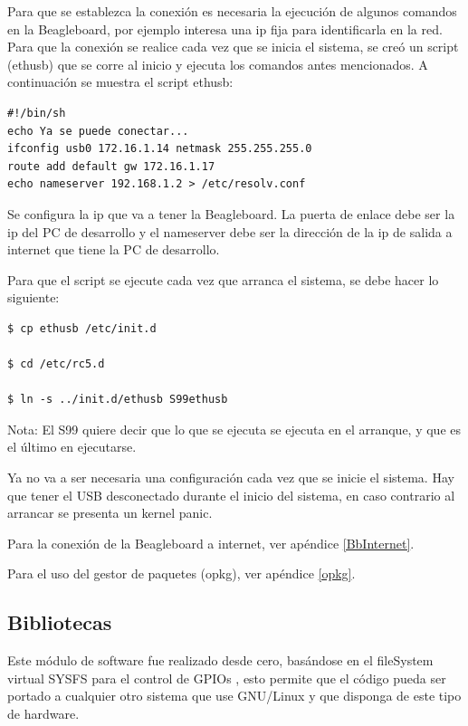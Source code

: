 \bigskip
Para que se establezca la conexión es necesaria la ejecución de algunos comandos en la Beagleboard, por ejemplo interesa una ip fija para identificarla en la red. Para que la conexión se realice cada vez que se inicia el sistema, se creó un script (ethusb) que se corre al inicio y ejecuta los comandos antes mencionados.
A continuación se muestra el script ethusb:

\begin{verbatim}
#!/bin/sh 
echo Ya se puede conectar... 
ifconfig usb0 172.16.1.14 netmask 255.255.255.0 
route add default gw 172.16.1.17 
echo nameserver 192.168.1.2 > /etc/resolv.conf 
\end{verbatim}

Se configura la ip que va a tener la Beagleboard. La puerta de enlace debe ser la ip del PC de desarrollo y el nameserver debe ser la dirección de la ip de salida a internet que tiene la PC de desarrollo.

\bigskip
Para que el script se ejecute cada vez que arranca el sistema, se debe hacer lo siguiente:

\bigskip
\begin{verbatim}
$ cp ethusb /etc/init.d

$ cd /etc/rc5.d

$ ln -s ../init.d/ethusb S99ethusb
\end{verbatim}

Nota: El S99 quiere decir que lo que se ejecuta se ejecuta en el arranque, y que es el último en ejecutarse.

\bigskip
Ya no va a ser necesaria una configuración cada vez que se inicie el sistema. 
Hay que tener el USB desconectado durante el inicio del sistema, en caso contrario al arrancar se presenta un kernel panic.

Para la conexión de la Beagleboard a internet, ver apéndice \ref{BbInternet}. 

Para el uso del gestor de paquetes (opkg), ver apéndice \ref{opkg}. 


\subsection{Bibliotecas}


Este módulo de software fue realizado desde cero, basándose en el fileSystem virtual SYSFS para el control de GPIOs \cite{gpio} \cite{gpioK}, esto permite que el código pueda ser portado a cualquier otro sistema que use GNU/Linux y que disponga de este tipo de hardware.


